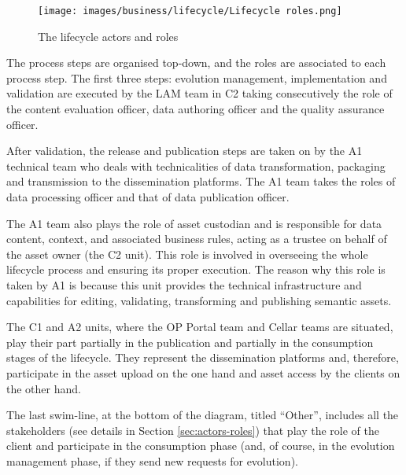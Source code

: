 	\begin{figure}[!h]
	\centering
	\texttt{[image: images/business/lifecycle/Lifecycle roles.png]}
	\caption{The lifecycle actors and roles}
	\label{fig:lifecycle-roles}
	\end{figure}

	The process steps are organised top-down, and the roles are associated to each process step. The first three steps: evolution management, implementation and validation are executed by the LAM team in C2 taking consecutively the role of the content evaluation officer, data authoring officer and the quality assurance officer. 
	
	After validation, the release and publication steps are taken on by the A1 technical team who deals with technicalities of data transformation, packaging and transmission to the dissemination platforms. The A1 team takes the roles of data processing officer and that of data publication officer. 
	
	The A1 team also plays the role of asset custodian and is responsible for data content, context, and associated business rules, acting as a trustee on behalf of the asset owner (the C2 unit). This role is involved in overseeing the whole lifecycle process and ensuring its proper execution. The reason why this role is taken by A1 is because this unit provides the technical infrastructure and capabilities for editing, validating, transforming and publishing semantic assets. 
	
	The C1 and A2 units, where the OP Portal team and Cellar teams are situated, play their part partially in the publication and partially in the consumption stages of the lifecycle. They represent the dissemination platforms and, therefore, participate in the asset upload on the one hand and asset access by the clients on the other hand. 
	
	The last swim-line, at the bottom of the diagram, titled ``Other'', includes all the stakeholders (see details in Section \ref{sec:actors-roles}) that play the role of the client and participate in the consumption phase (and, of course, in the evolution management phase, if they send new requests for evolution). 
